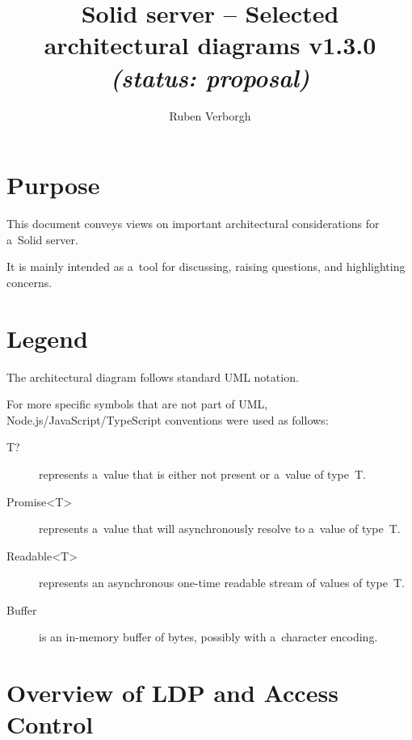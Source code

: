 \documentclass[10pt]{article}
\title{
  Solid server -- Selected architectural diagrams v1.3.0
  \it (status: proposal)
}
\author{Ruben Verborgh}
\begin{document}
\maketitle


\section*{Purpose}
This document conveys views
on important architectural considerations for a~Solid server.

It is mainly intended as a~tool for discussing,
raising questions,
and highlighting concerns.


\section*{Legend}
The architectural diagram follows standard UML notation.

For more specific symbols that are not part of UML,
Node.js/JavaScript/TypeScript conventions were used as follows:

\begin{description}
  \item[T?] represents a~value that is either not present
            or a~value of type~T.
  \item[Promise<T>] represents a~value that will asynchronously resolve
                    to a~value of type~T.
  \item[Readable<T>] represents an asynchronous one-time readable stream
                     of values of type~T.
  \item[Buffer] is an in-memory buffer of bytes,
                possibly with a~character encoding.
\end{description}

\section*{Overview of LDP and Access Control}

\newcommand\ResourceStoreBody{%
  + getRepresentation(ResourceIdentifier, RepresentationPreferences, Conditions?) : Promise<Representation>\\
  + addResource(container : ResourceIdentifier, Representation, Conditions?) : Promise<ResourceIdentifier>\\
  + setRepresentation(ResourceIdentifier, Representation, Conditions?) : Promise<void>\\
  + deleteResource(ResourceIdentifier, Conditions?) : Promise<void>\\
  + modifyResource(ResourceIdentifier, Patch, Conditions?) : Promise<void>\\
}
\end{document}
